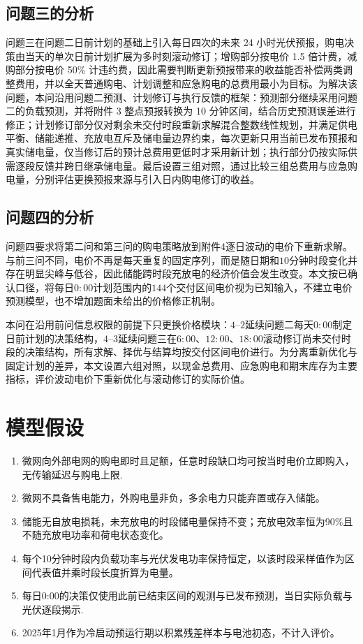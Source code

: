 \documentclass[12pt,a4paper]{ctexart}
\theoremstyle{definition}
\theoremstyle{plain}
\theoremstyle{remark}
\begin{document}
\subsection{问题三的分析}
问题三在问题二日前计划的基础上引入每日四次的未来 24 小时光伏预报，购电决策由当天的单次日前计划扩展为多时刻滚动修订；增购部分按电价 1.5 倍计费，减购部分按电价 50\% 计违约费，因此需要判断更新预报带来的收益能否补偿两类调整费用，并以全天普通购电、计划调整和应急购电的总费用最小为目标。为解决该问题，本问沿用问题二预测、计划修订与执行反馈的框架：预测部分继续采用问题二的负载预测，并将附件 3 整点预报转换为 10 分钟区间，结合历史预测误差进行修正；计划修订部分仅对剩余未交付时段重新求解混合整数线性规划，并满足供电平衡、储能递推、充放电互斥及储电量边界约束，每次更新只用当前已发布预报和真实储电量，仅当修订后的预计总费用更低时才采用新计划；执行部分仍按实际供需逐段反馈并跨日继承储电量。最后设置三组对照，通过比较三组总费用与应急购电量，分别评估更换预报来源与引入日内购电修订的收益。
\subsection{问题四的分析}
问题四要求将第二问和第三问的购电策略放到附件4逐日波动的电价下重新求解。与前三问不同，电价不再是每天重复的固定序列，而是随日期和$10$分钟时段变化并存在明显尖峰与低谷，因此储能跨时段充放电的经济价值会发生改变。本文按已确认口径，将每日$0{:}00$计划范围内的$144$个交付区间电价视为已知输入，不建立电价预测模型，也不增加题面未给出的价格修正机制。

本问在沿用前问信息权限的前提下只更换价格模块：$4$--$2$延续问题二每天$0{:}00$制定日前计划的决策结构，$4$--$3$延续问题三在$6{:}00$、$12{:}00$、$18{:}00$滚动修订尚未交付时段的决策结构，所有求解、择优与结算均按交付区间电价进行。为分离重新优化与固定计划的差异，本文设置六组对照，以现金总费用、应急购电和期末库存为主要指标，评价波动电价下重新优化与滚动修订的实际价值。


\section{模型假设}

\begin{enumerate}[label=\arabic*.]
\item 微网向外部电网的购电即时且足额，任意时段缺口均可按当时电价立即购入，无传输延迟与购电上限.
\item 微网不具备售电能力，外购电量非负，多余电力只能弃置或存入储能。
\item 储能无自放电损耗，未充放电的时段储电量保持不变；充放电效率恒为90\%且不随充放电功率和荷电状态变化。
\item 每个10分钟时段内负载功率与光伏发电功率保持恒定，以该时段采样值作为区间代表值并乘时段长度折算为电量。
\item 每日0:00的决策仅使用此前已结束区间的观测与已发布预测，当日实际负载与光伏逐段揭示.
\item 2025年1月作为冷启动预运行期以积累残差样本与电池初态，不计入评价。
\end{enumerate}
\end{document}
